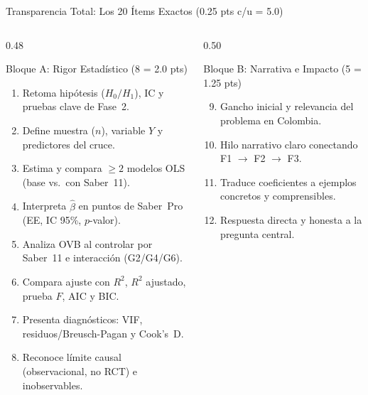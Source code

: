 \documentclass[aspectratio=169, 10pt]{beamer}
\begin{document}
\begin{frame}{Transparencia Total: Los 20 \'Items Exactos (0.25 pts c/u = 5.0)}
  \begin{columns}[T]
    \begin{column}{0.48\textwidth}
      \begin{block}{\small Bloque A: Rigor Estad\'istico (8 = 2.0 pts)}
        \scriptsize
        \begin{enumerate}\setlength{\itemsep}{2pt}
          \item Retoma hip\'otesis ($H_0/H_1$), IC y pruebas clave de Fase~2.
          \item Define muestra ($n$), variable $Y$ y predictores del cruce.
          \item Estima y compara $\ge 2$ modelos OLS (base vs.\ con Saber~11).
          \item Interpreta $\hat{\beta}$ en puntos de Saber~Pro (EE, IC 95\%, $p$-valor).
          \item Analiza OVB al controlar por Saber~11 e interacci\'on (G2/G4/G6).
          \item Compara ajuste con $R^2$, $R^2$ ajustado, prueba $F$, AIC y BIC.
          \item Presenta diagn\'osticos: VIF, residuos/Breusch-Pagan y Cook's~D.
          \item Reconoce l\'imite causal (observacional, no RCT) e inobservables.
        \end{enumerate}
      \end{block}
    \end{column}
    \begin{column}{0.50\textwidth}
      \begin{block}{\small Bloque B: Narrativa e Impacto (5 = 1.25 pts)}
        \scriptsize
        \begin{enumerate}\setcounter{enumi}{8}\setlength{\itemsep}{1pt}
          \item Gancho inicial y relevancia del problema en Colombia.
          \item Hilo narrativo claro conectando F1 $\rightarrow$ F2 $\rightarrow$ F3.
          \item Traduce coeficientes a ejemplos concretos y comprensibles.
          \item Respuesta directa y honesta a la pregunta central.

\end{enumerate}
\end{block}
\end{column}
\end{columns}
\end{frame}
\end{document}
